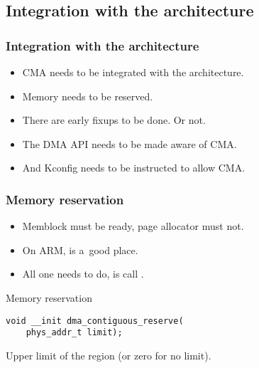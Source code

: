 
\subsection{Integration with the architecture}

\begin{frame}
  \frametitle{Integration with the architecture}

  \begin{itemize}
  \item CMA needs to be integrated with the architecture.
  \item Memory needs to be reserved.
  \item There are early fixups to be done. {\footnotesize Or not.}
  \item The DMA API needs to be made aware of CMA.
  \item And Kconfig needs to be instructed to allow CMA.
  \end{itemize}
\end{frame}

\begin{frame}[fragile]
  \frametitle{Memory reservation}

  \begin{itemize}
  \item Memblock must be ready, page allocator must not.
  \item On ARM,  is a~good place.
  \item All one needs to do, is call
    .
  \end{itemize}

  \begin{block}{Memory reservation}
\begin{lstlisting}
void __init dma_contiguous_reserve(
    phys_addr_t limit);
\end{lstlisting}
  \end{block}

  \begin{description}[limitAA]
  \item[{\ttfamily limit}] Upper limit of the region (or zero for no
    limit).
  \end{description}

\end{frame}

